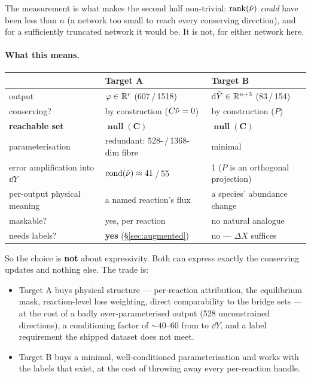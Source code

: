 The measurement is what makes the second half non-trivial: $\operatorname{rank}(\tilde\nu)$
\emph{could} have been less than $n$ (a network too small to reach every
conserving direction), and for a sufficiently truncated network it would be. It
is not, for either network here.

\paragraph{What this means.}

\begin{center}
\begin{tabularx}{\textwidth}{@{}L{4.2cm} Y Y@{}}
\toprule
 & \textbf{Target A} & \textbf{Target B} \\
\midrule
output & $\varphi \in \mathbb{R}^r$ (607\,/\,1518) &
  $\mathrm{d}\tilde Y \in \mathbb{R}^{n+3}$ (83\,/\,154) \\
conserving? & by construction ($C\tilde\nu = 0$) & by construction ($P$) \\
\textbf{reachable set} & $\mathbf{\operatorname{null}(C)}$ &
  $\mathbf{\operatorname{null}(C)}$ \\
parameterisation & redundant: 528-\,/\,1368-dim fibre & minimal \\
error amplification into $\dd Y$ & $\operatorname{cond}(\tilde\nu) \approx 41$\,/\,55 &
  1 ($P$ is an orthogonal projection) \\
per-output physical meaning & a named reaction's flux &
  a species' abundance change \\
maskable? & yes, per reaction & no natural analogue \\
needs \Phifl{} labels? & \textbf{yes} (\S\ref{sec:augmented}) &
  no --- $\Delta X$ suffices \\
\bottomrule
\end{tabularx}
\end{center}

So the choice is \textbf{not} about expressivity. Both can express exactly the
conserving updates and nothing else. The trade is:

\begin{itemize}
\item Target A buys physical structure --- per-reaction attribution, the
  equilibrium mask, reaction-level loss weighting, direct comparability to the
  bridge sets --- at the cost of a badly over-parameterised output (528
  unconstrained directions), a conditioning factor of ${\sim}40$--60 from
  \netflux{} to $\dd Y$, and a label requirement the shipped dataset does not
  meet.
\item Target B buys a minimal, well-conditioned parameterisation and works with
  the labels that exist, at the cost of throwing away every per-reaction handle.
\end{itemize}

